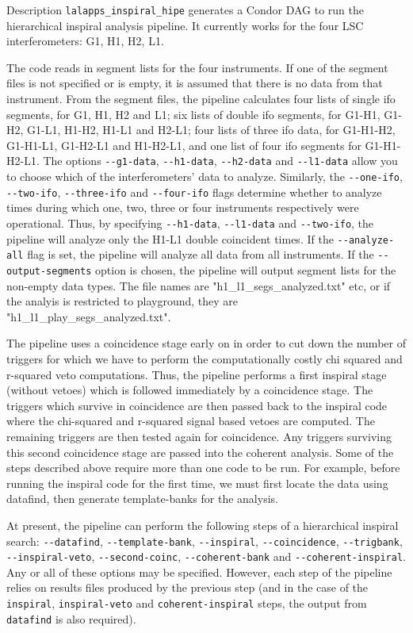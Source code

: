\begin{entry}
\item[Description] \verb$lalapps_inspiral_hipe$ generates a Condor DAG to run
the hierarchical inspiral analysis pipeline.  It currently works for
the four LSC interferometers: G1, H1, H2, L1. 

The code reads in segment lists for the four instruments.  If one of the
segment files is not specified or is empty, it is assumed that there is no
data from that instrument.  From the segment files, the pipeline calculates
four lists of single ifo segments, for G1, H1, H2 and L1; six lists of double
ifo segments, for G1-H1, G1-H2, G1-L1, H1-H2, H1-L1 and H2-L1; four lists of
three ifo data, for G1-H1-H2, G1-H1-L1, G1-H2-L1 and H1-H2-L1, and one list of
four ifo segments for G1-H1-H2-L1.  The options \verb$--g1-data$,
\verb$--h1-data$, \verb$--h2-data$ and \verb$--l1-data$ allow you to choose
which of the interferometers' data to analyze.  Similarly, the
\verb$--one-ifo$, \verb$--two-ifo$, \verb$--three-ifo$ and \verb$--four-ifo$
flags determine whether to analyze times during which one, two, three or four
instruments respectively were operational.  Thus, by specifying
\verb$--h1-data$, \verb$--l1-data$ and \verb$--two-ifo$, the pipeline will
analyze only the H1-L1 double coincident times.  If the \verb$--analyze-all$
flag is set, the pipeline will analyze all data from all instruments.  If the
\verb$--output-segments$ option is chosen, the pipeline will output segment
lists for the non-empty data types.  The file names are
"h1\_l1\_segs\_analyzed.txt" etc, or if the analyis is restricted to
playground, they are "h1\_l1\_play\_segs\_analyzed.txt".

The pipeline uses a coincidence stage early on in order to cut down the number
of triggers for which we have to perform the computationally costly chi
squared and r-squared veto computations.  Thus, the pipeline performs a first
inspiral stage (without vetoes) which is followed immediately by a coincidence
stage.  The triggers which survive in coincidence are then passed back to the
inspiral code where the chi-squared and r-squared signal based vetoes are
computed.  The remaining triggers are then tested again for coincidence.  Any
triggers surviving this second coincidence stage are passed into the coherent
analysis.  Some of the steps described above require more than one code to be
run.  For example, before running the inspiral code for the first time, we
must first locate the data using datafind, then generate template-banks for
the analysis.

At present, the pipeline can perform the following steps of a hierarchical
inspiral search: \verb$--datafind$, \verb$--template-bank$, \verb$--inspiral$,
\verb$--coincidence$, \verb$--trigbank$, \verb$--inspiral-veto$,
\verb$--second-coinc$, \verb$--coherent-bank$ and \verb$--coherent-inspiral$.
Any or all of these options may be specified.  However, each step of the
pipeline relies on results files produced by the previous step (and in the
case of the \verb$inspiral$, \verb$inspiral-veto$ and \verb$coherent-inspiral$
steps, the output from \verb$datafind$ is also required).


\end{entry}
